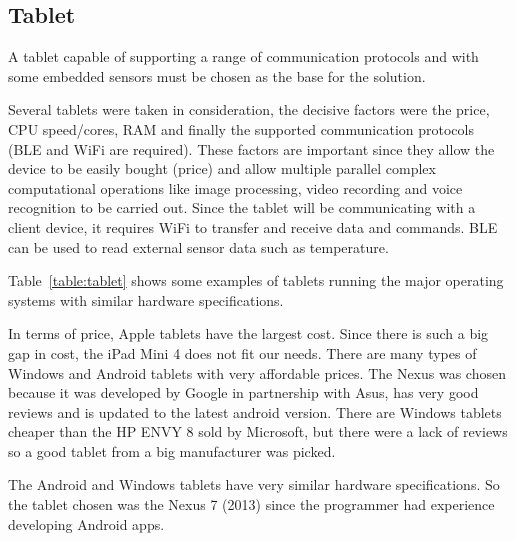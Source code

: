 
\subsection{Tablet}

A tablet capable of supporting a range of communication protocols and with some embedded sensors must be chosen as the base for the solution.

Several tablets were taken in consideration, the decisive factors were the price, \ac{CPU} speed/cores, \ac{RAM} and finally the supported communication protocols (\ac{BLE} and \ac{WiFi} are required). These factors are important since they allow the device to be easily bought (price) and allow multiple parallel complex computational operations like image processing, video recording and voice recognition to be carried out. Since the tablet will be communicating with a client device, it requires \ac{WiFi} to transfer and receive data and commands. \ac{BLE} can be used to read external sensor data such as temperature.


Table~\ref{table:tablet} shows some examples of tablets running the major operating systems with similar hardware specifications.

In terms of price, Apple tablets have the largest cost. Since there is such a big gap in cost, the iPad Mini 4 does not fit our needs. There are many types of Windows and Android tablets with very affordable prices. The Nexus was chosen because it was developed by Google in partnership with Asus, has very good reviews and is updated to the latest android version. There are Windows tablets cheaper than the HP ENVY 8 sold by Microsoft, but there were a lack of reviews so a good tablet from a big manufacturer was picked.

The Android and Windows tablets have very similar hardware specifications. So the tablet chosen was the Nexus 7 (2013) since the programmer had experience developing Android apps.


